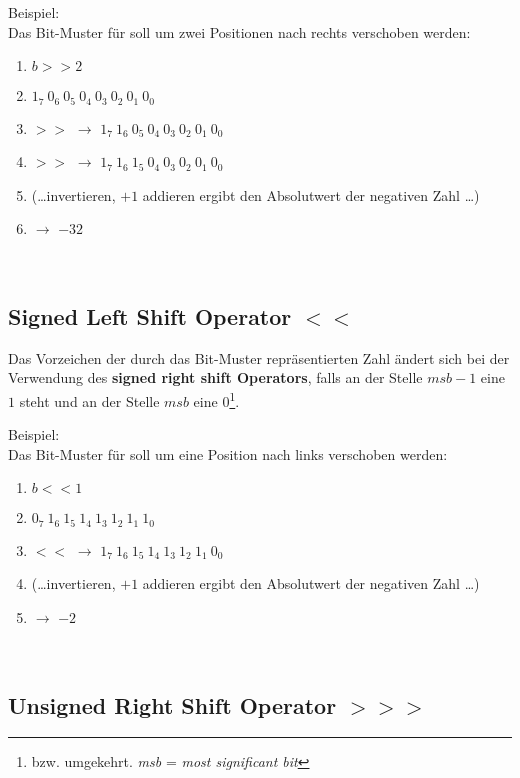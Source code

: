 \noindent
Beispiel:\\
Das Bit-Muster für  soll um zwei Positionen nach rechts verschoben werden:

\begin{enumerate}
    \item[] $b >> 2$
    \item $1_7\ 0_6\ 0_5\ 0_4\ 0_3\ 0_2\ 0_1\ 0_0$
    \item $>>$ $\rightarrow$ $1_7\ 1_6\ 0_5\ 0_4\ 0_3\ 0_2\ 0_1\ 0_0$
    \item $>>$ $\rightarrow$ $1_7\ 1_6\ 1_5\ 0_4\ 0_3\ 0_2\ 0_1\ 0_0$
    \item[] (\ldots invertieren, $+1$ addieren ergibt den Absolutwert der negativen Zahl \ldots)
    \item[]   $\rightarrow$ $-32$
\end{enumerate}\\


\subsection{Signed Left Shift Operator $<<$}


\begin{tcolorbox}
    Das Vorzeichen der durch das Bit-Muster repräsentierten Zahl ändert sich bei der Verwendung des \textbf{signed right shift Operators}, falls an der Stelle $msb - 1$ eine $1$ steht und an der Stelle $msb$ eine $0$\footnote{
        bzw. umgekehrt. \textit{msb} = \textit{most significant bit}
    }.
\end{tcolorbox}

\noindent
Beispiel:\\
Das Bit-Muster für  soll um eine Position nach links verschoben werden:

\begin{enumerate}
    \item[] $b << 1$
    \item $0_7\ 1_6\ 1_5\ 1_4\ 1_3\ 1_2\ 1_1\ 1_0$
    \item $<<$ $\rightarrow$ $1_7\ 1_6\ 1_5\ 1_4\ 1_3\ 1_2\ 1_1\ 0_0$
    \item[] (\ldots invertieren, $+1$ addieren ergibt den Absolutwert der negativen Zahl \ldots)
    \item[]   $\rightarrow$ $-2$
\end{enumerate}\\


\subsection{Unsigned Right Shift Operator $>>>$}

